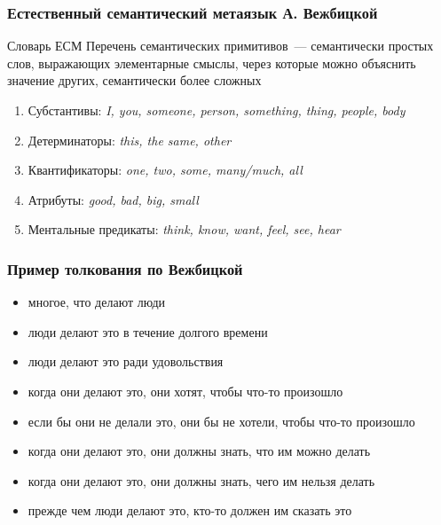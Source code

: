 \begin{frame}
  \frametitle{Естественный семантический метаязык А. Вежбицкой}

  \begin{exampleblock}{Словарь ЕСМ}
    Перечень семантических примитивов~--- семантически простых слов, выражающих элементарные смыслы,
    через которые можно объяснить значение других, семантически более сложных
  \end{exampleblock}

  \begin{enumerate}
    \item Субстантивы: \textit{I, you, someone, person, something, thing, people, body}
    \item Детерминаторы: \textit{this, the same, other}
    \item Квантификаторы: \textit{one, two, some, many/much, all}
    \item Атрибуты: \textit{good, bad, big, small}
    \item Ментальные предикаты: \textit{think, know, want, feel, see, hear}
  \end{enumerate}
\end{frame}

\begin{frame}
  \frametitle{Пример толкования по Вежбицкой}

  \begin{exampleblock}{}
    \begin{itemize}
      \item многое, что делают люди
      \item люди делают это в течение долгого времени
      \item люди делают это ради удовольствия
      \item когда они делают это, они хотят, чтобы что-то произошло
      \item если бы они не делали это, они бы не хотели, чтобы что-то произошло
      \item когда они делают это, они должны знать, что им можно делать
      \item когда они делают это, они должны знать, чего им нельзя делать
      \item прежде чем люди делают это, кто-то должен им сказать это
    \end{itemize}
  \end{exampleblock}
\end{frame}
